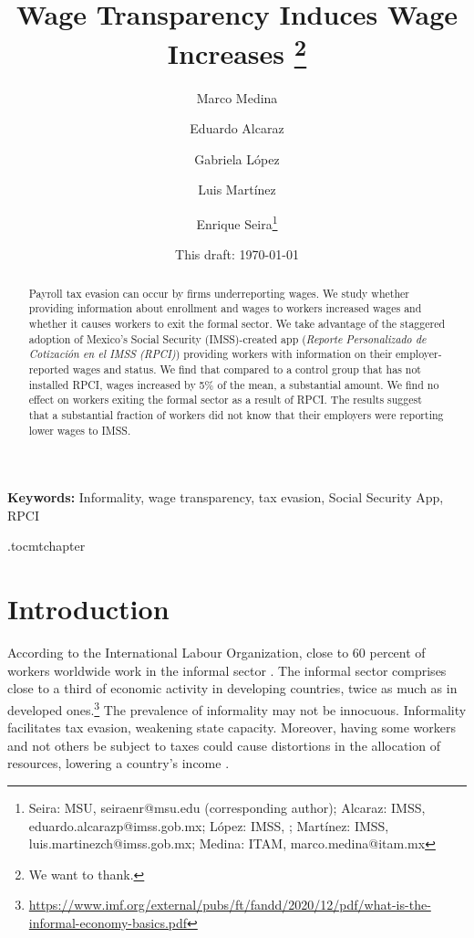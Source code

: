 \documentclass[oneside,11pt]{article}
\begin{document}
\title{Wage Transparency Induces Wage Increases \thanks{We want to thank.}}
\author{Marco Medina \and Eduardo Alcaraz \and Gabriela López \and Luis Martínez \and Enrique Seira\thanks{Seira: MSU, seiraenr@msu.edu (corresponding author); Alcaraz: IMSS, eduardo.alcarazp@imss.gob.mx; López: IMSS, ; Martínez: IMSS, luis.martinezch@imss.gob.mx; Medina:  ITAM, marco.medina@itam.mx}}
\date{This draft:  \today \\[2 cm]}  %




\maketitle
\thispagestyle{empty}
\begin{abstract}

Payroll tax evasion can occur by firms underreporting wages. We study whether providing information about enrollment and wages to workers increased wages and whether it causes workers to exit the formal sector. 
We take advantage of the staggered adoption of Mexico's Social Security (IMSS)-created app (\textit{Reporte Personalizado de Cotización en el IMSS (RPCI)}) providing workers with information on their employer-reported wages and status. We find that compared to a control group that has not installed RPCI, wages increased by 5\% of the mean, a substantial amount. We find no effect on workers exiting the formal sector as a result of RPCI. The results suggest that a substantial fraction of workers did not know that their employers were reporting lower wages to IMSS.

\end{abstract}

\vspace{.3in}

\textbf{Keywords:} Informality, wage transparency, tax evasion, Social Security App, RPCI


\newpage

\etocdepthtag.toc{mtchapter}

\section{Introduction} \label{introduction}

According to the International Labour Organization, close to 60 percent of workers worldwide work in the informal sector \citep{ILO_2018}. The informal sector comprises close to a third of economic activity in developing countries, twice as much as in developed ones.\footnote{\url{https://www.imf.org/external/pubs/ft/fandd/2020/12/pdf/what-is-the-informal-economy-basics.pdf}} The prevalence of informality may not be innocuous. Informality facilitates tax evasion, weakening state capacity. Moreover, having some workers and not others be subject to taxes could cause distortions in the allocation of resources, lowering a country's income \citep{Misallocation}. 
\end{document}
